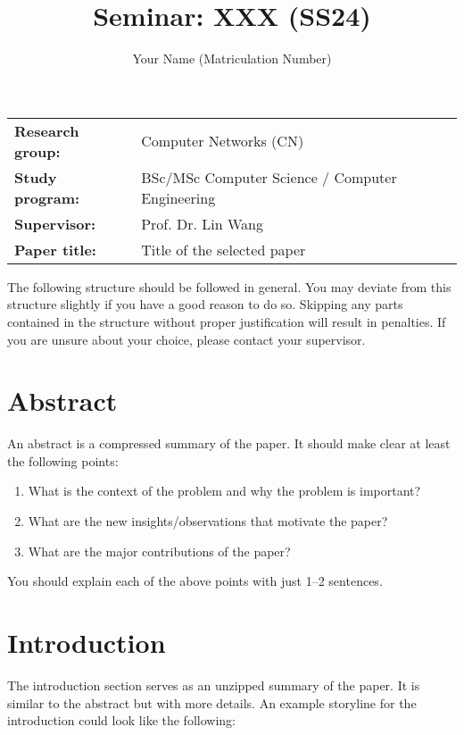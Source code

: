 \documentclass[report]{../upb-cn}
\title{Seminar: XXX (SS24)}
\author{Your Name (Matriculation Number)}
\begin{document}
\makethetitle

\begin{notebox}
    \begin{tabular}{@{}ll}
        \textbf{Research group:} & Computer Networks (CN) \\
        \textbf{Study program:} & BSc/MSc Computer Science / Computer Engineering \\
        \textbf{Supervisor:} & Prof. Dr. Lin Wang \\
        \textbf{Paper title:} & Title of the selected paper
    \end{tabular}
\end{notebox}

The following structure should be followed in general. You may deviate from this structure slightly if you have a good reason to do so. Skipping any parts contained in the structure without proper justification will result in penalties. If you are unsure about your choice, please contact your supervisor.

\section*{Abstract}

An abstract is a compressed summary of the paper. It should make clear at least the following points:
\begin{enumerate}
    \item What is the context of the problem and why the problem is important?
    \item What are the new insights/observations that motivate the paper?
    \item What are the major contributions of the paper?
\end{enumerate}

You should explain each of the above points with just 1--2 sentences.



\section{Introduction}
\label{sec:introduction}

The introduction section serves as an unzipped summary of the paper. It is similar to the abstract but with more details. An example storyline for the introduction could look like the following:
\end{document}
